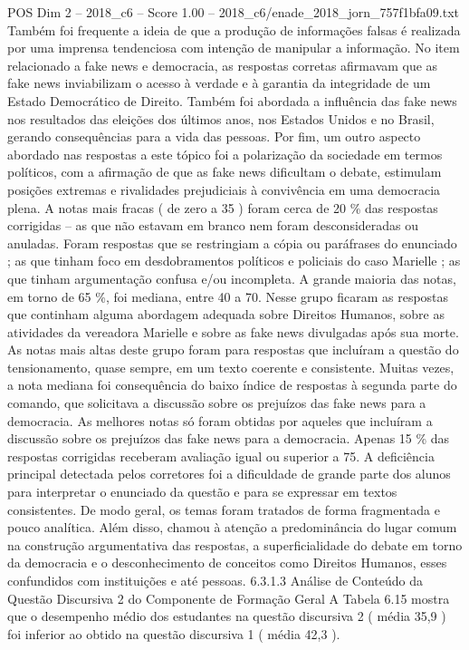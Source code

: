 \begin{textsample}{POS Dim 2 – 2018\_c6 – Score 1.00 – 2018\_c6/enade\_2018\_jorn\_757f1bfa09.txt}
Também foi frequente a ideia de que a produção de informações falsas é realizada por uma imprensa tendenciosa com intenção de manipular a informação.
No item relacionado a fake news e democracia, as respostas corretas afirmavam que as fake news inviabilizam o acesso à verdade e à garantia da integridade de um Estado Democrático de Direito.
Também foi abordada a influência das fake news nos resultados das eleições dos últimos anos, nos Estados Unidos e no Brasil, gerando consequências para a vida das pessoas.
Por fim, um outro aspecto abordado nas respostas a este tópico foi a polarização da sociedade em termos políticos, com a afirmação de que as fake news dificultam o debate, estimulam posições extremas e rivalidades prejudiciais à convivência em uma democracia plena.
A notas mais fracas ( de zero a 35 ) foram cerca de 20 \% das respostas corrigidas – as que não estavam em branco nem foram desconsideradas ou anuladas.
Foram respostas que se restringiam a cópia ou paráfrases do enunciado ; as que tinham foco em desdobramentos políticos e policiais do caso Marielle ; as que tinham argumentação confusa e/ou incompleta.
A grande maioria das notas, em torno de 65 \%, foi mediana, entre 40 a 70.
Nesse grupo ficaram as respostas que continham alguma abordagem adequada sobre Direitos Humanos, sobre as atividades da vereadora Marielle e sobre as fake news divulgadas após sua morte.
As notas mais altas deste grupo foram para respostas que incluíram a questão do tensionamento, quase sempre, em um texto coerente e consistente.
Muitas vezes, a nota mediana foi consequência do baixo índice de respostas à segunda parte do comando, que solicitava a discussão sobre os prejuízos das fake news para a democracia.
As melhores notas só foram obtidas por aqueles que incluíram a discussão sobre os prejuízos das fake news para a democracia.
Apenas 15 \% das respostas corrigidas receberam avaliação igual ou superior a 75.
A deficiência principal detectada pelos corretores foi a dificuldade de grande parte dos alunos para interpretar o enunciado da questão e para se expressar em textos consistentes.
De modo geral, os temas foram tratados de forma fragmentada e pouco analítica.
Além disso, chamou à atenção a predominância do lugar comum na construção argumentativa das respostas, a superficialidade do debate em torno da democracia e o desconhecimento de conceitos como Direitos Humanos, esses confundidos com instituições e até pessoas. 6.3.1.3 Análise de Conteúdo da Questão Discursiva 2 do Componente de Formação Geral A Tabela 6.15 mostra que o desempenho médio dos estudantes na questão discursiva 2 ( média 35,9 ) foi inferior ao obtido na questão discursiva 1 ( média 42,3 ).

\end{textsample}
